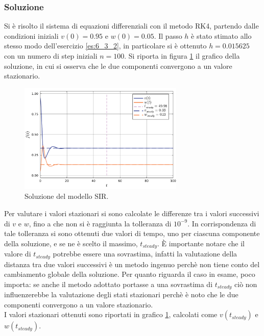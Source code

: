 \documentclass[letterpaper, 12pt]{article}
\numberwithin{equation}{section}    %
\begin{document}
\subsubsection{Soluzione}
Si è risolto il sistema di equazioni differenziali con il metodo RK4, partendo dalle condizioni iniziali
$v(0) = 0.95$ e $w(0) = 0.05$. Il passo $h$ è stato stimato allo stesso modo dell'esercizio \ref{es:6_3_2}, in 
particolare si è ottenuto $h = 0.015625$ con un numero di step iniziali $n = 100$. Si riporta in figura
\ref{fig:es6_3_3} il grafico della soluzione, in cui si osserva che le due componenti 
convergono a un valore stazionario. \\
\begin{figure}[!ht]
    \centering
    \includegraphics[width=0.7\textwidth]{6331.pdf}
    \caption{Soluzione del modello SIR.}
    \label{fig:es6_3_3}
\end{figure}
Per valutare i valori stazionari si sono calcolate le differenze
tra i valori successivi di $v$ e $w$, fino a che non si è raggiunta la tolleranza di $10^{-9}$. In corrispondenza
di tale tolleranza si sono ottenuti due valori di tempo, uno per ciascuna componente della soluzione, e se 
ne è scelto il massimo, $t_{steady}$.
È importante notare che il valore di $t_{steady}$ potrebbe essere una sovrastima, 
infatti la valutazione della distanza
tra due valori successivi è un metodo ingenuo perchè non tiene conto del cambiamento globale 
della soluzione. Per quanto riguarda il caso in esame, poco importa: se anche il metodo adottato portasse a 
una sovrastima di $t_{steady}$ ciò non influenzerebbe 
la valutazione degli stati stazionari perchè è noto che le due componenti convergono a un valore stazionario. \\
I valori stazionari ottenuti sono riportati in grafico \ref{fig:es6_3_3}, calcolati come $v(t_{steady})$ e 
$w(t_{steady})$.
\end{document}
